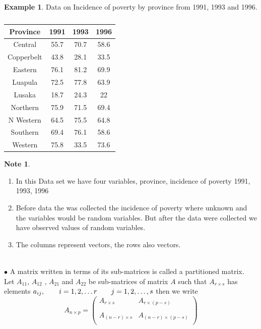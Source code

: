 \documentclass[11pt,a4paper]{article}
\theoremstyle{definition}
\newtheorem{exa}[thm]{Example}
\newtheorem{note}[thm]{Note}
\begin{document}
\pagebreak
\begin{exa}
Data on Incidence of poverty by province from 1991, 1993 and 1996.
\end{exa}


\begin{table}[H]
\centering
\begin{tabular}{|c|c|c|c|}
\hline
Province & 1991 & 1993 & 1996\\
\hline
Central & 55.7 & 70.7 & 58.6\\
Copperbelt & 43.8 & 28.1 & 33.5\\
Eastern & 76.1  & 81.2 & 69.9\\
Luapula & 72.5 & 77.8 & 63.9\\
Lusaka  & 18.7 & 24.3 & 22\\
Northern & 75.9  & 71.5 & 69.4\\
N Western & 64.5 & 75.5 & 64.8\\
Southern & 69.4 & 76.1 & 58.6\\
Western & 75.8 & 33.5 & 73.6\\
\hline
\end{tabular}
\caption{}
\end{table}



\begin{note}
\begin{enumerate}
\item In this Data set we have four variables, province, incidence of poverty 1991, 1993, 1996
\item Before data the was collected the incidence of poverty where unknown and the variables would be random variables. But after the data were collected we have observed values of random variables.
\item The columns represent vectors, the rows also vectors.\\\\
\end{enumerate}
\end{note}





$\bullet$ A matrix written in terms of its sub-matrices is called a partitioned matrix.\\

Let $A_{11}$, $A_{12}$ , $A_{21}$ and $A_{22}$ be sub-matrices of matrix $A$ such that $A_{r\times s}$ has elements $a_{ij},\\\qquad i=1,2,\ldots r\qquad j=1,2,\ldots,s$ then we write
$$A_{n\times p} =
\begin{pmatrix}
A_{r\times s} & A_{r\times (p-s)}\\
&\\
A_{(n-r)\times s} & A_{(n-r)\times (p-s)}\\
\end{pmatrix}
$$\\
\end{document}
